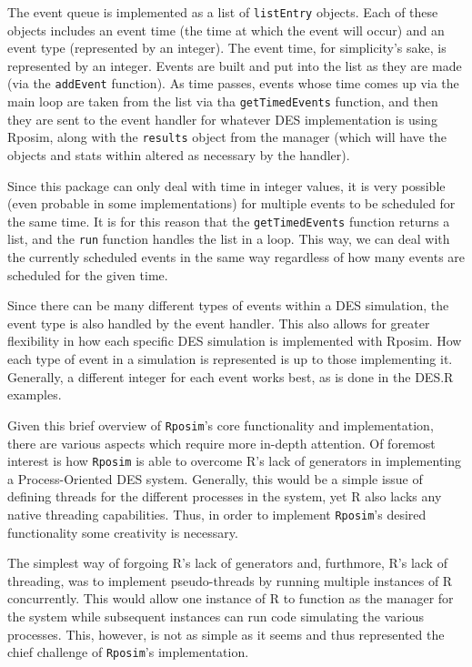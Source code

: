 \documentclass[a4paper, 11pt]{article} %
\begin{document}
The event queue is implemented as a list of \texttt{listEntry} objects. Each of these objects includes an event time (the time at which the event will occur) and an event type (represented by an integer). The event time, for simplicity's sake, is represented by an integer. Events are built and put into the list as they are made (via the \texttt{addEvent} function). As time passes, events whose time comes up via the main loop are taken from the list via tha \texttt{getTimedEvents} function, and then they are sent to the event handler for whatever DES implementation is using Rposim, along with the \texttt{results} object from the manager (which will have the objects and stats within altered as necessary by the handler).

Since this package can only deal with time in integer values, it is very possible (even probable in some implementations) for multiple events to be scheduled for the same time. It is for this reason that the \texttt{getTimedEvents} function returns a list, and the \texttt{run} function handles the list in a loop. This way, we can deal with the currently scheduled events in the same way regardless of how many events are scheduled for the given time.

Since there can be many different types of events within a DES simulation, the event type is also handled by the event handler. This also allows for greater flexibility in how each specific DES simulation is implemented with Rposim. How each type of event in a simulation is represented is up to those implementing it. Generally, a different integer for each event works best, as is done in the DES.R examples.

Given this brief overview of \texttt{Rposim}'s core functionality and implementation, there are various aspects which require more in-depth attention. Of foremost interest is how \texttt{Rposim} is able to overcome R's lack of generators in implementing a Process-Oriented DES system. Generally, this would be a simple issue of defining threads for the different processes in the system, yet R also lacks any native threading capabilities. Thus, in order to implement \texttt{Rposim}'s desired functionality some creativity is necessary.

The simplest way of forgoing R's lack of generators and, furthmore, R's lack of threading, was to implement pseudo-threads by running multiple instances of R concurrently. This would allow one instance of R to function as the manager for the system while subsequent instances can run code simulating the various processes. This, however, is not as simple as it seems and thus represented the chief challenge of \texttt{Rposim}'s implementation.
\end{document}
